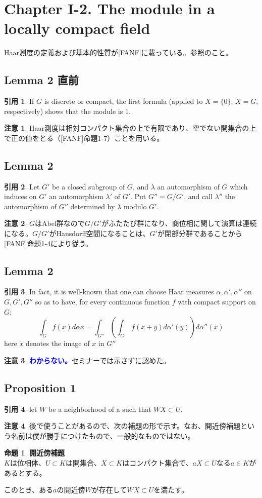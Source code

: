 \documentclass[12pt]{jsarticle}%
\renewenvironment{leftbar}{%
  \renewcommand\FrameCommand{\vrule width 1pt \hspace{10pt}}%
  \MakeFramed {\advance\hsize-\width \FrameRestore}}%
 {\endMakeFramed}
\newcommand{\barquo}[1]{\begin{leftbar} \begin{quo} #1 \end{quo} \end{leftbar}}%
\newcommand{\textblue}[1]{\textcolor{blue}{\textbf{#1}}}
\newcommand{\bfsubsection}[1]{\subsection*{\textbf{#1}}}
\newcommand{\bfsection}[1]{\section*{\textbf{#1}}}
\theoremstyle{definition}%
\newtheorem*{proposition}{命題}
\newcommand{\prop}[1]{\begin{oframed} \begin{proposition} #1 \end{proposition} \end{oframed}}%
\newtheorem*{rem}{注意}
\newtheorem*{quo}{引用}
\begin{document}
\newpage
\bfsection{Chapter I-2. The module in a locally compact field}
Haar測度の定義および基本的性質が[FANF]\cite{FANF}に載っている。参照のこと。


\bfsubsection{Lemma 2 直前}
\barquo{
If $G$ is discrete or compact, the first formula (applied to $X = \{0 \}$, $X=G$, respectively) shows that the module is 1.}

\begin{rem}
Haar測度は相対コンパクト集合の上で有限であり、空でない開集合の上で正の値をとる（[FANF]\cite{FANF}命題1-7）ことを用いる。
\end{rem}


\bfsubsection{Lemma 2}
\barquo{
Let $G'$ be a closed subgroup of $G$, and $\lambda$ an automorphism of $G$ which induces on $G'$ an automorphism $\lambda'$ of $G'$. Put $G'' = G/G'$, and call $\lambda''$ the automorphism of $G''$ determined by $\lambda$ modulo $G'$.}

\begin{rem}
$G$はAbel群なので$G/G'$がふたたび群になり、商位相に関して演算は連続になる。$G/G'$がHausdorff空間になることは、$G'$が閉部分群であることから[FANF]\cite{FANF}命題1-4により従う。
\end{rem}


\bfsubsection{Lemma 2}
\barquo{
In fact, it is well-known that one can choose Haar measures $\alpha, \alpha', \alpha''$ on $G,G',G''$ so as to have, for every continuous function $f$ with compact support on $G$:
\[
\int_{G}f(x)d\alpha x =\int_{G''} \left(\int_{G'}f(x+y)d\alpha'(y) \right)d\alpha''(\dot{x})
\]
here $\dot{x}$ denotes the image of $x$ in $G''$}

\begin{rem}
\textblue{わからない。}セミナーでは示さずに認めた。
\end{rem}

\bfsubsection{Proposition 1}
\barquo{
let $W$ be a neighborhood of a such that $WX \subset U$.}
\begin{rem}
後で使うことがあるので、次の補題の形で示す。なお、開近傍補題という名前は僕が勝手につけたもので、一般的なものではない。
\end{rem}




\prop{
\textbf{開近傍補題} \\
$K$は位相体、$U \subset K$は開集合、$X \subset K$はコンパクト集合で、$aX \subset U$なる$a \in K$があるとする。

このとき、ある$a$の開近傍$W$が存在して$WX \subset U$を満たす。
}
\end{document}
